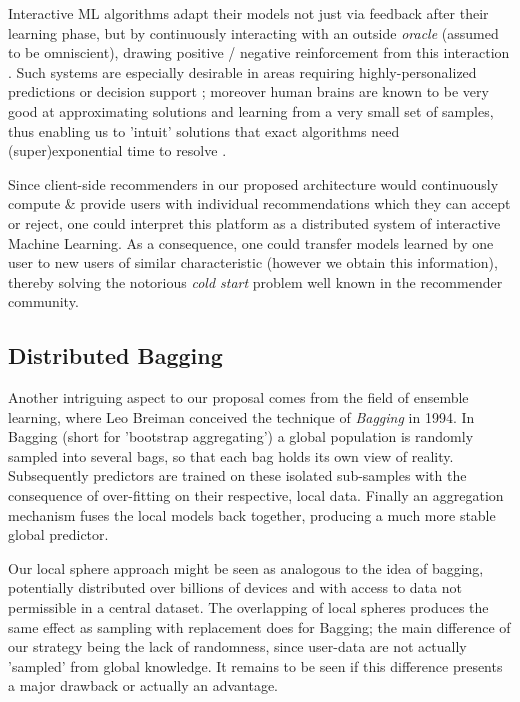 \documentclass{llncs}
\begin{document}
Interactive ML algorithms adapt their models not just via feedback after their learning phase, but by continuously interacting with an outside \textit{oracle} (assumed to be omniscient), drawing positive / negative reinforcement from this interaction \cite{2016HolzingeriML}. Such systems are especially desirable in areas requiring highly-personalized predictions or decision support \cite{2016KiesebergDITL}; moreover human brains are known to be very good at approximating solutions and learning from a very small set of samples, thus enabling us to 'intuit' solutions that exact algorithms need (super)exponential time to resolve \cite{2016iMLExperiment}.

Since client-side recommenders in our proposed architecture would continuously compute \& provide users with individual recommendations which they can accept or reject, one could interpret this platform as a distributed system of interactive Machine Learning. As a consequence, one could transfer models learned by one user to new users of similar characteristic (however we obtain this information), thereby solving the notorious \textit{cold start} problem well known in the recommender community.


\subsection{Distributed Bagging}
\label{ssect:dist_bag}

Another intriguing aspect to our proposal comes from the field of ensemble learning, where Leo Breiman conceived the technique of \textit{Bagging} \cite{breiman1996bagging} in 1994. In Bagging (short for 'bootstrap aggregating') a global population is randomly sampled into several bags, so that each bag holds its own view of reality. Subsequently predictors are trained on these isolated sub-samples with the consequence of over-fitting on their respective, local data. Finally an aggregation mechanism fuses the local models back together, producing a much more stable global predictor.

Our local sphere approach might be seen as analogous to the idea of bagging, potentially distributed over billions of devices and with access to data not permissible in a central dataset. The overlapping of local spheres produces the same effect as sampling with replacement does for Bagging; the main difference of our strategy being the lack of randomness, since user-data are not actually 'sampled' from global knowledge. It remains to be seen if this difference presents a major drawback or actually an advantage.
\end{document}

